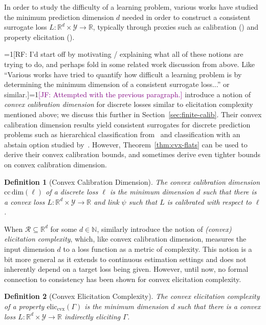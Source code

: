 \documentclass{article}
\newcommand{\Comments}{1}
\newcommand{\mynote}[2]{\ifnum\Comments=1\textcolor{#1}{#2}\fi}
\newcommand{\raf}[1]{\mynote{green!80!blue}{[RF: #1]}}
\newcommand{\jessie}[1]{\mynote{purple}{[JF: #1]}}
\newcommand{\reals}{\mathbb{R}}
\newcommand{\eliccvx}{\mathrm{elic}_\mathrm{cvx}}
\newcommand{\ccdim}{\mathrm{cc\,dim}}
\newcommand{\R}{\mathcal{R}}
\newcommand{\Y}{\mathcal{Y}}
\newtheorem{definition}{Definition}
\begin{document}
In order to study the difficulty of a learning problem, various works have studied the minimum prediction dimension $d$ needed in order to construct a consistent surrogate loss $L: \reals^d \times \Y \to \reals$, typically through proxies such as calibration (\cite{ramaswamy2016convex}) and property elicitation (\cite{frongillo2015vector-valued,fissler2015higher,frongillo2018elicitation}).

\raf{I'd start off by motivating / explaining what all of these notions are trying to do, and perhaps fold in some related work discussion from above.  Like ``Various works have tried to quantify how difficult a learning problem is by determining the minimum dimension of a consistent surrogate loss...'' or similar.}\jessie{Attempted with the previous paragraph.}
\cite{ramaswamy2016convex} introduce a notion of \emph{convex calibration dimension} for discrete losses similar to elicitation complexity mentioned above; we discuss this further in Section~\ref{sec:finite-calib}.
Their convex calibration dimension results yield consistent surrogates for discrete prediction problems such as hierarchical classification from~\cite{ramaswamy2015hierarchical} and classification with an abstain option studied by~\cite{ramaswamy2018consistent}.
However, Theorem~\ref{thm:cvx-flats} can be used to derive their convex calibration bounds, and sometimes derive even tighter bounds on convex calibration dimension.

\begin{definition}[Convex Calibration Dimension]
	The \emph{convex calibration dimension} $\ccdim(\ell)$ of a discrete loss $\ell$ is the minimum dimension $d$ such that there is a convex loss $L: \reals^d \times \Y \to \reals$ and link $\psi$ such that $L$ is calibrated with respect to $\ell$.
\end{definition}

When $\R \subseteq \reals^d$ for some $d \in \mathbb{N}$, \cite{frongillo2018elicitation} similarly introduce the notion of \emph{(convex) elicitation complexity}, which, like convex calibration dimension, measures the input dimension $d$ to a loss function as a metric of complexity.
This notion is a bit more general as it extends to continuous estimation settings and does not inherently depend on a target loss being given. 
However, until now, no formal connection to consistency has been shown for convex elicitation complexity.

\begin{definition}[Convex Elicitation Complexity]
	The \emph{convex elicitation complexity} of a property $\eliccvx(\Gamma)$ is the minimum dimension $d$ such that there is a convex loss $L : \reals^d \times \Y \to \reals$ indirectly eliciting $\Gamma$.
\end{definition}
\end{document}
